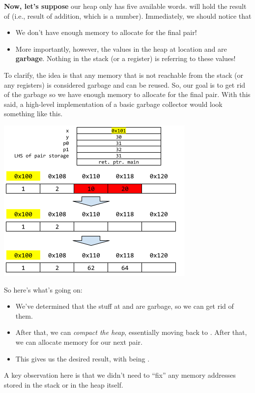 \documentclass[letterpaper]{article}
\begin{document}
\bigskip 

\textbf{Now, let's suppose} our heap only has five available words.  will hold the result of  (i.e., result of addition, which is a number). Immediately, we should notice that 
\begin{itemize}
    \item We don't have enough memory to allocate for the final pair!
    \item More importantly, however, the values in the heap at location  and  are \textbf{garbage}. Nothing in the stack (or a register) is referring to these values!  
\end{itemize}
To clarify, the idea is that any memory that is not reachable from the stack (or any registers) is considered garbage and can be reused. So, our goal is to get rid of the garbage so we have enough memory to allocate for the final pair. With this said, a high-level implementation of a basic garbage collector would look something like this. 
\begin{center}
    \includegraphics[scale=0.7]{../assets/stackHeapPairGCFix1.png}
\end{center}
So here's what's going on:
\begin{itemize}
    \item We've determined that the stuff at  and  are garbage, so we can get rid of them. 
    \item After that, we can \emph{compact the heap}, essentially moving  back to . After that, we can allocate memory for our next pair. 
    \item This gives us the desired result, with  being . 
\end{itemize}
A key observation here is that we didn't need to ``fix'' any memory addresses stored in the stack or in the heap itself. 
\end{document}
